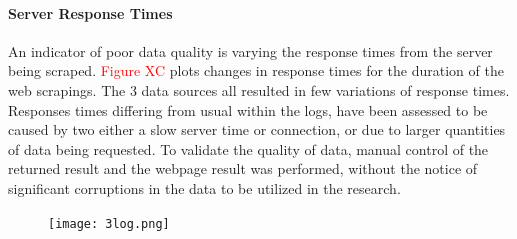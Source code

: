 \documentclass[12pt,a4paper]{article}
\begin{document}
\paragraph{Server Response Times}
An indicator of poor data quality is varying the response times from the server being scraped. \textcolor{red}{Figure XC} plots changes in response times for the duration of the web scrapings. The 3 data sources all resulted in few variations of response times.  Responses times differing from usual within the logs, have been assessed to be caused by two either a slow server time or connection, or due to larger quantities of data being requested. To validate the quality of data, manual control of the returned result and the webpage result was performed, without the notice of significant corruptions in the data to be utilized in the research.
\begin{figure}[H]
  \centering
   \caption{}
   \texttt{[image: 3log.png]} 
  \label{fig:}
\end{figure}
\end{document}
